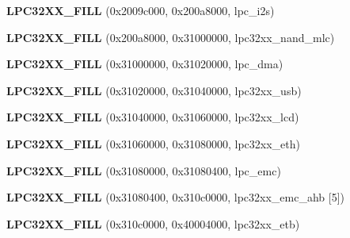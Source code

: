 \begin{DoxyCompactItemize}
\mbox{\label{structlpc32xx__registers_a31ed62e6608fb3fcdf0da3b101a53286}} 
{\bfseries L\+P\+C32\+X\+X\+\_\+\+F\+I\+LL} (0x2009c000, 0x200a8000, lpc\+\_\+i2s)
\item 
\mbox{\label{structlpc32xx__registers_af6a69f827cd09cf27e8700fddf16222b}} 
{\bfseries L\+P\+C32\+X\+X\+\_\+\+F\+I\+LL} (0x200a8000, 0x31000000, lpc32xx\+\_\+nand\+\_\+mlc)
\item 
\mbox{\label{structlpc32xx__registers_aca3cbe2cb75e0652cc8d2eea687a0c79}} 
{\bfseries L\+P\+C32\+X\+X\+\_\+\+F\+I\+LL} (0x31000000, 0x31020000, lpc\+\_\+dma)
\item 
\mbox{\label{structlpc32xx__registers_abf58ad19125be90602b753cbcba263b6}} 
{\bfseries L\+P\+C32\+X\+X\+\_\+\+F\+I\+LL} (0x31020000, 0x31040000, lpc32xx\+\_\+usb)
\item 
\mbox{\label{structlpc32xx__registers_a7270e3e0afc7b2560a17b750d7da91e9}} 
{\bfseries L\+P\+C32\+X\+X\+\_\+\+F\+I\+LL} (0x31040000, 0x31060000, lpc32xx\+\_\+lcd)
\item 
\mbox{\label{structlpc32xx__registers_a65993f47bd8bb111e107242cd20329bd}} 
{\bfseries L\+P\+C32\+X\+X\+\_\+\+F\+I\+LL} (0x31060000, 0x31080000, lpc32xx\+\_\+eth)
\item 
\mbox{\label{structlpc32xx__registers_a539a7ad985dcf35e6cc73f885006d67a}} 
{\bfseries L\+P\+C32\+X\+X\+\_\+\+F\+I\+LL} (0x31080000, 0x31080400, lpc\+\_\+emc)
\item 
\mbox{\label{structlpc32xx__registers_ab92d708d554d72b7837986b778a5a8a1}} 
{\bfseries L\+P\+C32\+X\+X\+\_\+\+F\+I\+LL} (0x31080400, 0x310c0000, lpc32xx\+\_\+emc\+\_\+ahb \mbox{[}5\mbox{]})
\item 
\mbox{\label{structlpc32xx__registers_a68ff88eafa0fb768d4bf5514e6fbbfac}} 
{\bfseries L\+P\+C32\+X\+X\+\_\+\+F\+I\+LL} (0x310c0000, 0x40004000, lpc32xx\+\_\+etb)
\item 
\mbox{\label{structlpc32xx__registers_ae6efbdeb41b36cc9fa1d43a49c53c945}} 

\end{DoxyCompactItemize}
